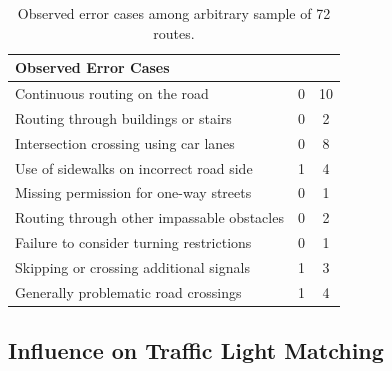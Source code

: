 \begin{table}[htbp]
\centering
\begin{tabular}{lcc}
\hline
\textbf{Observed Error Cases} \\ \hline
Continuous routing on the road & 0 & 10 \\
Routing through buildings or stairs & 0 & 2 \\
Intersection crossing using car lanes & 0 & 8 \\
Use of sidewalks on incorrect road side & 1 & 4 \\
Missing permission for one-way streets & 0 & 1 \\
Routing through other impassable obstacles & 0 & 2 \\
Failure to consider turning restrictions & 0 & 1 \\
Skipping or crossing additional signals & 1 & 3 \\
Generally problematic road crossings & 1 & 4 \\
\hline
\end{tabular}
\caption{Observed error cases among arbitrary sample of 72 routes.}%
\label{tab:accuracy-comparison}%
\end{table}

\subsection{Influence on Traffic Light Matching}

